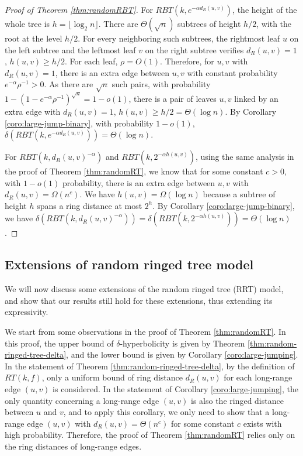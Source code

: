 \documentclass[11pt]{article}
\begin{document}
\begin{proof}[Proof of Theorem \ref{thm:randomRBT}]
For $RBT(k,e^{-\alpha d_R(u,v)})$, the height of the whole tree is 
	$h = \lfloor \log_2 n \rfloor$. 
There are $\Theta(\sqrt{n})$ subtrees of height $h/2$, with the root
	at the level $h/2$. 
For every neighboring such subtrees, the rightmost leaf $u$ on the 
	left subtree and the leftmost leaf $v$ on the right subtree 
	verifies $d_R(u,v)=1$, $h(u,v) \geq h/2$. For each leaf, $\rho=O(1)$. 
Therefore, for $u,v$ with $d_R(u,v)=1$, there is an extra edge between $u,v$ 
	with constant probability $e^{-\alpha}\rho^{-1} > 0$. 
As there are $\sqrt{n}$ such pairs, with probability 
	$1-(1-e^{-\alpha}\rho^{-1})^{\sqrt{n}}=1-o(1)$, 
	there is a pair of leaves $u,v$ linked by an extra edge with 
	$d_R(u,v)=1$, $h(u,v) \geq h/2 = \Theta(\log n)$. 
By Corollary \ref{coro:large-jump-binary}, with probability $1-o(1)$, 
	$\delta(RBT(k,e^{-\alpha d_R(u,v)}))=\Theta(\log n)$.

For $RBT(k,d_R(u,v)^{-\alpha})$ and $RBT(k,2^{-\alpha h(u,v)})$, using the same analysis in the proof of Theorem \ref{thm:randomRT}, we know that for some constant $c>0$, with $1-o(1)$ probability, there is an extra edge between $u,v$ with $d_R(u,v) = \Omega(n^c)$. We have $h(u,v)=\Omega(\log n)$ because a subtree of height $h$ spans a ring distance at most $2^h$. By Corollary \ref{coro:large-jump-binary}, we have $\delta(RBT(k,d_R(u,v)^{-\alpha}))=\delta(RBT(k,2^{-\alpha h(u,v)}))=\Theta(\log n)$.
\end{proof}

\subsection{Extensions of random ringed tree model} \label{sec:rtringextension}

We will now discuss some extensions of the random ringed tree (RRT) model,
	and show that our results still hold for these extensions,
	thus extending its expressivity.

We start from some observations in the proof of Theorem \ref{thm:randomRT}. 
In this proof, the upper bound of $\delta$-hyperbolicity is given by 
	Theorem \ref{thm:random-ringed-tree-delta}, and 
	the lower bound is given by Corollary \ref{coro:large-jumping}. 
In the statement of Theorem \ref{thm:random-ringed-tree-delta}, by the
	definition of $RT(k,f)$, only a uniform bound of ring distance
	$d_R(u,v)$ for each long-range edge $(u,v)$ is considered. 
In the statement of Corollary \ref{coro:large-jumping}, the only quantity
	concerning a long-range edge $(u,v)$ is also the ringed distance
	between $u$ and $v$, and to apply this corollary, we only need to show that
	a long-range edge $(u,v)$ with $d_R(u,v)=\Theta(n^c)$ for some
	constant $c$ exists with high probability. 
Therefore, the proof of
	Theorem \ref{thm:randomRT} relies only on the ring distances of
	long-range edges.
\end{document}
